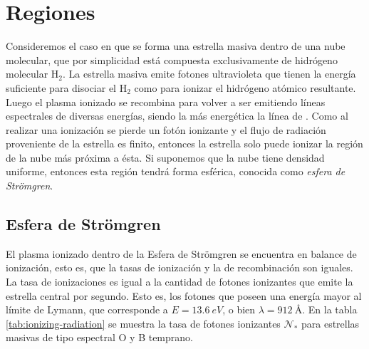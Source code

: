 \appendix
\newcommand{\norm}[1]{\left\lVert#1\right\rVert}

\chapter[Regiones \Ion{H}{II}]{Regiones  \citep{Stahler:2004}}
\label{app:HII}
\newcommand\Nio{\ensuremath{\mathcal{N}}}

Consideremos el caso en que se forma una estrella masiva dentro de una nube molecular, que por simplicidad está compuesta exclusivamente de hidrógeno molecular $\mathrm{H_2}$. La estrella masiva emite fotones ultravioleta que tienen la energía suficiente para disociar el $\mathrm{H_2}$  como para ionizar el hidrógeno atómico resultante. Luego el plasma ionizado se recombina para volver a ser  emitiendo líneas espectrales de diversas energías, siendo la más energética la línea de . Como al realizar una ionización se pierde un fotón ionizante y el flujo de radiación proveniente de la estrella es finito, entonces la estrella solo puede ionizar la región de la nube más próxima a ésta. Si suponemos que la nube tiene densidad uniforme, entonces esta región tendrá forma esférica, conocida como \textit{esfera de Strömgren}.

\section{Esfera de Strömgren}

El plasma ionizado dentro de la Esfera de Strömgren se encuentra en balance de ionización, esto es, que la tasas de ionización y la de recombinación son iguales. La tasa de ionizaciones es igual a la cantidad de fotones ionizantes que emite la estrella central por segundo. Esto es, los fotones que poseen una energía mayor al límite de Lymann, que corresponde a  $E = \SI{13.6}{eV}$, o bien $\lambda = \SI{912}{\angstrom}$. En la tabla \ref{tab:ionizing-radiation} se muestra la tasa de fotones ionizantes $\Nio_*$ para estrellas masivas de tipo espectral O y B temprano.

